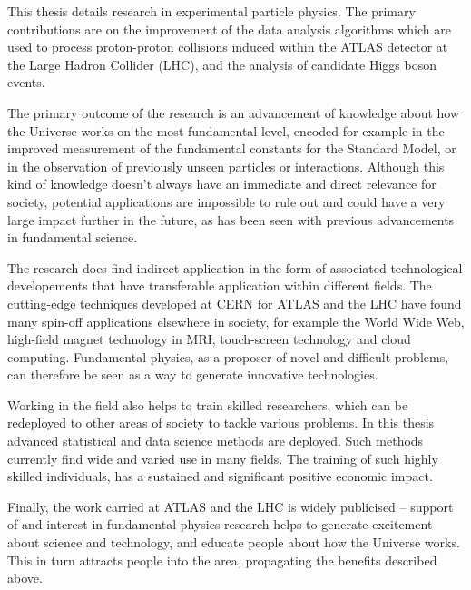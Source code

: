 
This thesis details research in experimental particle physics.
The primary contributions are on the improvement of the data analysis algorithms which are used to process proton-proton collisions induced within the ATLAS detector at the Large Hadron Collider (LHC), and the analysis of candidate Higgs boson events.

The primary outcome of the research is an advancement of knowledge about how the Universe works on the most fundamental level, encoded for example in the improved measurement of the fundamental constants for the Standard Model, or in the observation of previously unseen particles or interactions.
Although this kind of knowledge doesn't always have an immediate and direct relevance for society, potential applications are impossible to rule out and could have a very large impact further in the future, as has been seen with previous advancements in fundamental science.

The research does find indirect application in the form of associated technological developements that have transferable application within different fields.
The cutting-edge techniques developed at CERN for ATLAS and the LHC have found many spin-off applications elsewhere in society, for example the World Wide Web, high-field magnet technology in MRI, touch-screen technology and cloud computing.
Fundamental physics, as a proposer of novel and difficult problems, can therefore be seen as a way to generate innovative technologies.

Working in the field also helps to train skilled researchers, which can be redeployed to other areas of society to tackle various problems.
In this thesis advanced statistical and data science methods are deployed.
Such methods currently find wide and varied use in many fields.
The training of such highly skilled individuals, has a sustained and significant positive economic impact.

Finally, the work carried at ATLAS and the LHC is widely publicised -- support of and interest in fundamental physics research helps to generate excitement about science and technology, and educate people about how the Universe works.
This in turn attracts people into the area, propagating the benefits described above.
